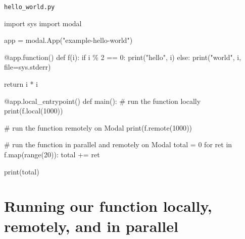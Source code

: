\documentclass[
  letterpaper,
  DIV=11,
  numbers=noendperiod]{scrreprt}
\newenvironment{Shaded}{\begin{snugshade}}{\end{snugshade}}
\newcommand{\AttributeTok}[1]{\textcolor[rgb]{0.40,0.45,0.13}{#1}}
\newcommand{\BuiltInTok}[1]{\textcolor[rgb]{0.00,0.23,0.31}{#1}}
\newcommand{\CommentTok}[1]{\textcolor[rgb]{0.37,0.37,0.37}{#1}}
\newcommand{\ControlFlowTok}[1]{\textcolor[rgb]{0.00,0.23,0.31}{#1}}
\newcommand{\DecValTok}[1]{\textcolor[rgb]{0.68,0.00,0.00}{#1}}
\newcommand{\ImportTok}[1]{\textcolor[rgb]{0.00,0.46,0.62}{#1}}
\newcommand{\KeywordTok}[1]{\textcolor[rgb]{0.00,0.23,0.31}{#1}}
\newcommand{\NormalTok}[1]{\textcolor[rgb]{0.00,0.23,0.31}{#1}}
\newcommand{\OperatorTok}[1]{\textcolor[rgb]{0.37,0.37,0.37}{#1}}
\newcommand{\StringTok}[1]{\textcolor[rgb]{0.13,0.47,0.30}{#1}}
\begin{document}
\begin{codelisting}

\caption{\texttt{hello_world.py}}

\begin{Shaded}
\begin{Highlighting}[]
\ImportTok{import}\NormalTok{ sys}
\ImportTok{import}\NormalTok{ modal}

\NormalTok{app }\OperatorTok{=}\NormalTok{ modal.App(}\StringTok{"example{-}hello{-}world"}\NormalTok{)}

\AttributeTok{@app.function}\NormalTok{()}
\KeywordTok{def}\NormalTok{ f(i):}
    \ControlFlowTok{if}\NormalTok{ i }\OperatorTok{\%} \DecValTok{2} \OperatorTok{==} \DecValTok{0}\NormalTok{:}
        \BuiltInTok{print}\NormalTok{(}\StringTok{"hello"}\NormalTok{, i)}
    \ControlFlowTok{else}\NormalTok{:}
        \BuiltInTok{print}\NormalTok{(}\StringTok{"world"}\NormalTok{, i, }\BuiltInTok{file}\OperatorTok{=}\NormalTok{sys.stderr)}

    \ControlFlowTok{return}\NormalTok{ i }\OperatorTok{*}\NormalTok{ i}

\AttributeTok{@app.local\_entrypoint}\NormalTok{()}
\KeywordTok{def}\NormalTok{ main():}
    \CommentTok{\# run the function locally}
    \BuiltInTok{print}\NormalTok{(f.local(}\DecValTok{1000}\NormalTok{))}

    \CommentTok{\# run the function remotely on Modal}
    \BuiltInTok{print}\NormalTok{(f.remote(}\DecValTok{1000}\NormalTok{))}

    \CommentTok{\# run the function in parallel and remotely on Modal}
\NormalTok{    total }\OperatorTok{=} \DecValTok{0}
    \ControlFlowTok{for}\NormalTok{ ret }\KeywordTok{in}\NormalTok{ f.}\BuiltInTok{map}\NormalTok{(}\BuiltInTok{range}\NormalTok{(}\DecValTok{20}\NormalTok{)):}
\NormalTok{        total }\OperatorTok{+=}\NormalTok{ ret}

    \BuiltInTok{print}\NormalTok{(total)}
\end{Highlighting}
\end{Shaded}

\end{codelisting}

\hypertarget{running-our-function-locally-remotely-and-in-parallel}{%
\section{Running our function locally, remotely, and in
parallel}\label{running-our-function-locally-remotely-and-in-parallel}}
\end{document}
